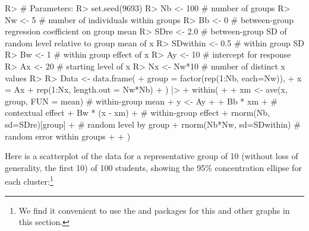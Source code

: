 \documentclass[
]{jss}
\begin{document}
\begin{CodeChunk}
\begin{CodeInput}
R> # Parameters:
R> set.seed(9693) 
R> Nb <- 100     # number of groups
R> Nw <- 5       # number of individuals within groups
R> Bb <- 0       # between-group regression coefficient on group mean
R> SDre <- 2.0   # between-group SD of random level relative to group mean of x
R> SDwithin <- 0.5  # within group SD
R> Bw <- 1          # within group effect of x
R> Ay <- 10         # intercept for response
R> Ax <- 20         # starting level of x
R> Nx <- Nw*10      # number of distinct x values
R> 
R> Data <- data.frame(
+   group = factor(rep(1:Nb, each=Nw)),
+   x = Ax + rep(1:Nx, length.out = Nw*Nb)
+ ) |>
+   within(
+     {
+       xm  <- ave(x, group, FUN = mean) # within-group mean
+       y <- Ay +
+         Bb * xm +                    # contextual effect
+         Bw * (x - xm) +              # within-group effect
+         rnorm(Nb, sd=SDre)[group] +  # random level by group
+         rnorm(Nb*Nw, sd=SDwithin)    # random error within groups
+     }
+   )
\end{CodeInput}
\end{CodeChunk}

Here is a scatterplot of the data for a representative group of 10
(without loss of generality, the first 10) of 100 students, showing the
95\% concentration ellipse for each cluster:\footnote{We find it
  convenient to use the  \citep{Sarkar:2008} and
   \citep{SarkarAndrews:2022} packages for this and
  other graphs in this section.}
\end{document}
